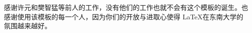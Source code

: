 \acknowledgement
感谢许元和樊智猛等前人的工作，没有他们的工作也就不会有这个模板的诞生。也感谢使用该模板的每一个人，因为你们的开放与进取心使得 \LaTeX 在东南大学的氛围越来越好。